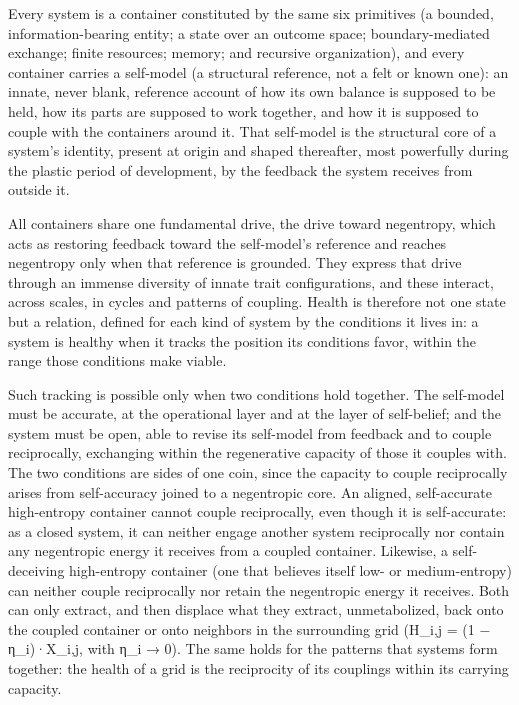 \documentclass[
]{article}
\begin{document}
Every system is a container constituted by the same six primitives (a
bounded, information-bearing entity; a state over an outcome space;
boundary-mediated exchange; finite resources; memory; and recursive
organization), and every container carries a self-model (a structural
reference, not a felt or known one): an innate, never blank, reference
account of how its own balance is supposed to be held, how its parts are
supposed to work together, and how it is supposed to couple with the
containers around it. That self-model is the structural core of a
system's identity, present at origin and shaped thereafter, most
powerfully during the plastic period of development, by the feedback the
system receives from outside it.

All containers share one fundamental drive, the drive toward negentropy,
which acts as restoring feedback toward the self-model's reference and
reaches negentropy only when that reference is grounded. They express
that drive through an immense diversity of innate trait configurations,
and these interact, across scales, in cycles and patterns of coupling.
Health is therefore not one state but a relation, defined for each kind
of system by the conditions it lives in: a system is healthy when it
tracks the position its conditions favor, within the range those
conditions make viable.

Such tracking is possible only when two conditions hold together. The
self-model must be accurate, at the operational layer and at the layer
of self-belief; and the system must be open, able to revise its
self-model from feedback and to couple reciprocally, exchanging within
the regenerative capacity of those it couples with. The two conditions
are sides of one coin, since the capacity to couple reciprocally arises
from self-accuracy joined to a negentropic core. An aligned,
self-accurate high-entropy container cannot couple reciprocally, even
though it is self-accurate: as a closed system, it can neither engage
another system reciprocally nor contain any negentropic energy it
receives from a coupled container. Likewise, a self-deceiving
high-entropy container (one that believes itself low- or medium-entropy)
can neither couple reciprocally nor retain the negentropic energy it
receives. Both can only extract, and then displace what they extract,
unmetabolized, back onto the coupled container or onto neighbors in the
surrounding grid (H\_i,j = (1 − η\_i)·X\_i,j, with η\_i → 0). The same
holds for the patterns that systems form together: the health of a grid
is the reciprocity of its couplings within its carrying capacity.
\end{document}
